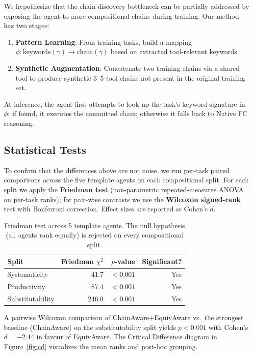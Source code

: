 \documentclass[10pt]{article}
\begin{document}
We hypothesize that the chain-discovery bottleneck can be partially addressed by exposing the agent to more compositional chains during training. Our method has two stages:

\begin{enumerate}
    \item {\bf Pattern Learning}: From training tasks, build a mapping $\phi: \text{keywords}(\gamma) \to \text{chain}(\gamma)$ based on extracted tool-relevant keywords.
    \item {\bf Synthetic Augmentation}: Concatenate two training chains via a shared tool to produce synthetic 3--5-tool chains not present in the original training set.
\end{enumerate}

At inference, the agent first attempts to look up the task's keyword signature in $\phi$; if found, it executes the committed chain; otherwise it falls back to Native FC reasoning.

\subsection{Statistical Tests}
\label{sec:stats}

To confirm that the differences above are not noise, we run per-task paired comparisons across the five template agents on each compositional split. For each split we apply the {\bf Friedman test} (non-parametric repeated-measures ANOVA on per-task ranks); for pair-wise contrasts we use the {\bf Wilcoxon signed-rank} test with Bonferroni correction. Effect sizes are reported as Cohen's $d$.

\begin{table}[t]
    \centering
    \small
    \begin{tabular}{lrrr}
        \toprule
        Split & Friedman $\chi^2$ & $p$-value & Significant? \\
        \midrule
        Systematicity & 41.7 & $< 0.001$ & Yes \\
        Productivity & 87.4 & $< 0.001$ & Yes \\
        Substitutability & 246.0 & $< 0.001$ & Yes \\
        \bottomrule
    \end{tabular}
    \caption{Friedman test across 5 template agents. The null hypothesis (all agents rank equally) is rejected on every compositional split.}
    \label{tab:friedman}
\end{table}

A pairwise Wilcoxon comparison of ChainAware+EquivAware vs.\ the strongest baseline (ChainAware) on the substitutability split yields $p < 0.001$ with Cohen's $d = -2.44$ in favour of EquivAware. The Critical Difference diagram in Figure~\ref{fig:cd} visualizes the mean ranks and post-hoc grouping.
\end{document}
